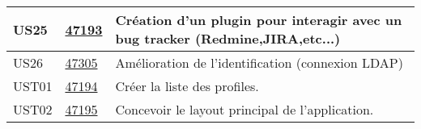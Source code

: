 \begin{center}
\begin{tabular}{|l|p{1.5cm}|p{14cm}|}
        \hline
US25	&	\href{https://redmine-projets.smile.fr/issues/47193}{47193}	&	Création d'un plugin pour interagir avec un bug tracker (Redmine,JIRA,etc...)	                \\
        \hline
US26	&	\href{https://redmine-projets.smile.fr/issues/47305}{47305}	&	Amélioration de l'identification (connexion LDAP)	                                            \\
        \hline
UST01	&	\href{https://redmine-projets.smile.fr/issues/47194}{47194}	&	Créer la liste des profiles.	                                                                \\
        \hline
UST02	&	\href{https://redmine-projets.smile.fr/issues/47195}{47195}	&	Concevoir le layout principal de l'application.	                                                \\
        \hline
    \end{tabular}
\end{center}
\newpage{}

	

\newpage{}


\newpage{}


\newpage{}


\newpage{}


\newpage{}


\newpage{}


\newpage{}


\newpage{}


\newpage{}


\newpage{}


\newpage{}


\newpage{}


\newpage{}


\newpage{}


\newpage{}


\newpage{}


\newpage{}

